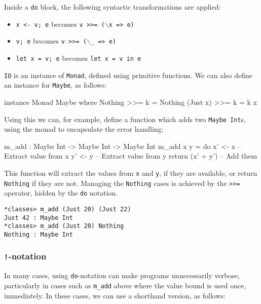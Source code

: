 \noindent
Inside a \texttt{do} block, the following syntactic transformations are
applied:

\begin{itemize}
\item \texttt{x <- v; e} becomes \texttt{v >>= ($\backslash$x => e)}
\item \texttt{v; e} becomes \texttt{v >>= ($\backslash$\_ => e)}
\item \texttt{let x = v; e} becomes \texttt{let x = v in e}
\end{itemize}

\noindent
\texttt{IO} is an instance of \texttt{Monad}, defined using primitive functions.
We can also define an instance for \texttt{Maybe}, as follows:

\begin{code}
instance Monad Maybe where
    Nothing  >>= k = Nothing
    (Just x) >>= k = k x
\end{code}

\noindent
Using this we can, for example, define a function which adds two \texttt{Maybe Int}s, using the monad to encapsulate the error handling:

\begin{code}
m_add : Maybe Int -> Maybe Int -> Maybe Int
m_add x y = do x' <- x -- Extract value from x
               y' <- y -- Extract value from y
               return (x' + y') -- Add them 
\end{code}

\noindent
This function will extract the values from \texttt{x} and \texttt{y}, if they are available, or return \texttt{Nothing} if they are not.
Managing the \texttt{Nothing} cases is achieved by the \texttt{>>=} operator, hidden by the \texttt{do} notation.

\begin{lstlisting}[style=stdout]
*classes> m_add (Just 20) (Just 22) 
Just 42 : Maybe Int
*classes> m_add (Just 20) Nothing 
Nothing : Maybe Int
\end{lstlisting}

\subsubsection*{\texttt{!}-notation}

In many cases, using \texttt{do}-notation can make programs unnecessarily
verbose, particularly in cases such as \texttt{m\_add} above where the value
bound is used once, immediately. In these cases, we can use a shorthand
version, as follows:

